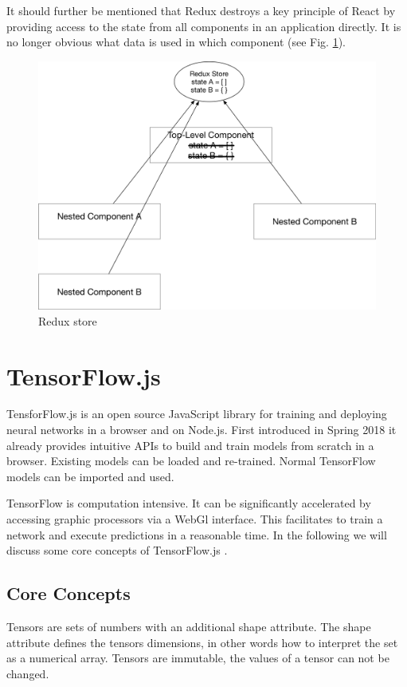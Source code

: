 It should further be mentioned that Redux destroys a key principle of React by 
providing access to the state from all components in an application directly. 
It is no longer obvious what data is used in which component (see Fig. \ref{fig:Redux}).
\begin{figure}[H]
	\centering
	\includegraphics[width=0.8\linewidth]{bilder/grundlagen/reduxStore.png}
	\caption{Redux store}
	\label{fig:Redux}
\end{figure}

\section{TensorFlow.js}
TensforFlow.js is an open source JavaScript library for training and deploying
neural networks in a browser and on Node.js. 
First introduced in Spring 2018 it already provides intuitive APIs to build and train models from scratch in a browser.
Existing models can be loaded and re-trained.
Normal TensorFlow models can be imported and used. 

TensorFlow is computation intensive.
It can be significantly accelerated by accessing graphic processors via a WebGl interface.
This facilitates to train a network and execute predictions in a reasonable time. 
In the following we will discuss some core concepts of TensorFlow.js \cite{TenosrFLowJs}. 

\subsection{Core Concepts}

Tensors are sets of numbers with an additional shape attribute.
The shape attribute defines the tensors dimensions, 
in other words how to interpret the set as a numerical array.
Tensors are immutable, the values of a tensor can not be changed.

